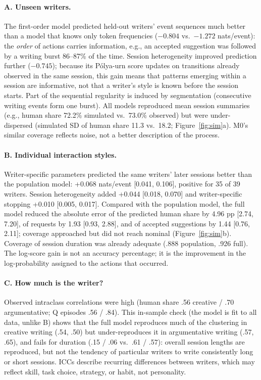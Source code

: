 \documentclass[10pt]{article}
\begin{document}
\paragraph{A. Unseen writers.} The first-order model predicted held-out writers' event sequences much better than a model that knows only token frequencies ($-0.804$ vs.\ $-1.272$ nats/event): the \emph{order} of actions carries information, e.g., an accepted suggestion was followed by a writing burst 86--87\% of the time. Session heterogeneity improved prediction further ($-0.745$); because its P\'olya-urn score updates on transitions already observed in the same session, this gain means that patterns emerging within a session are informative, not that a writer's style is known before the session starts. Part of the sequential regularity is induced by segmentation (consecutive writing events form one burst). All models reproduced mean session summaries (e.g., human share 72.2\% simulated vs.\ 73.0\% observed) but were under-dispersed (simulated SD of human share 11.3 vs.\ 18.2; Figure~\ref{fig:sim}a). M0's similar coverage reflects noise, not a better description of the process.

\paragraph{B. Individual interaction styles.} Writer-specific parameters predicted the same writers' later sessions better than the population model: +0.068 nats/event [0.041, 0.106], positive for 35 of 39 writers. Session heterogeneity added +0.044 [0.018, 0.070] and writer-specific stopping +0.010 [0.005, 0.017]. Compared with the population model, the full model reduced the absolute error of the predicted human share by 4.96 pp [2.74, 7.20], of requests by 1.93 [0.93, 2.88], and of accepted suggestions by 1.44 [0.76, 2.11]; coverage approached but did not reach nominal (Figure~\ref{fig:sim}b). Coverage of session duration was already adequate (.888 population, .926 full). The log-score gain is not an accuracy percentage; it is the improvement in the log-probability assigned to the actions that occurred.

\paragraph{C. How much is the writer?} Observed intraclass correlations were high (human share .56 creative / .70 argumentative; Q episodes .56 / .84). This in-sample check (the model is fit to all data, unlike B) shows that the full model reproduces much of the clustering in creative writing (.54, .50) but under-reproduces it in argumentative writing (.57, .65), and fails for duration (.15 / .06 vs.\ .61 / .57): overall session lengths are reproduced, but not the tendency of particular writers to write consistently long or short sessions. ICCs describe recurring differences between writers, which may reflect skill, task choice, strategy, or habit, not personality.
\end{document}
